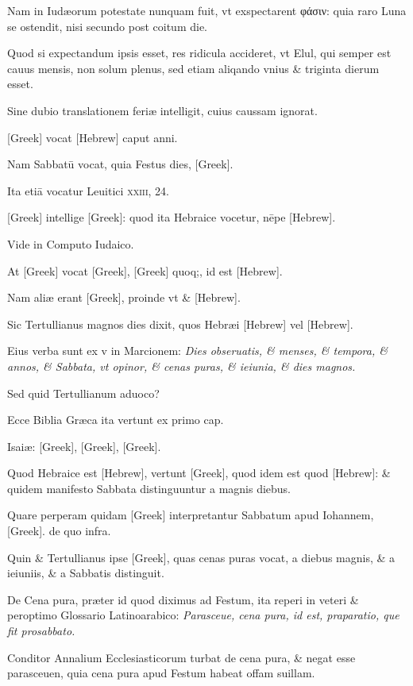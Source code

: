 \begin{parnumbers}
Nam in Iudæorum potestate
nunquam fuit, vt exspectarent \textgreek{φάσιν}: quia raro Luna se ostendit,
nisi secundo post coitum die.

Quod si expectandum ipsis esset,
res ridicula accideret, vt Elul, qui semper est cauus mensis, non solum
plenus, sed etiam aliqando vnius \& triginta dierum esset.

Sine dubio translationem feriæ intelligit, cuius caussam ignorat.

\textgreek{[Greek]} vocat \texthebrew{[Hebrew]} caput anni.

Nam Sabbatū vocat, quia Festus
dies, \textgreek{[Greek]}.

Ita etiā vocatur Leuitici \textsc{xxiii}, 24.

\textgreek{[Greek]} intellige
\textgreek{[Greek]}: quod ita Hebraice vocetur, nēpe \texthebrew{[Hebrew]}.

Vide in Computo Iudaico.

At \textgreek{[Greek]} vocat \textgreek{[Greek],
[Greek]} quoq;, id est \texthebrew{[Hebrew]}.

Nam aliæ erant \textgreek{[Greek]},
proinde vt \& \texthebrew{[Hebrew]}.

Sic Tertullianus magnos dies dixit, quos
Hebræi \texthebrew{[Hebrew]} vel \texthebrew{[Hebrew]}.

Eius verba sunt ex v in Marcionem:
\textit{Dies obseruatis, \& menses, \& tempora, \& annos, \& Sabbata, vt opinor,
\& cenas puras, \& ieiunia, \& dies magnos.}

Sed quid Tertullianum
aduoco?

Ecce Biblia Græca ita vertunt ex primo cap.

Isaiæ:
\textgreek{[Greek], [Greek], [Greek]}.

Quod Hebraice est \texthebrew{[Hebrew]}, vertunt \textgreek{[Greek]}, quod idem
est quod \texthebrew{[Hebrew]}: \& quidem manifesto Sabbata distinguuntur a
magnis diebus. 

Quare perperam quidam \textgreek{[Greek]} interpretantur
Sabbatum apud Iohannem, \textgreek{[Greek]}. de quo infra.

Quin \& Tertullianus ipse \textgreek{[Greek]},
quas cenas puras vocat, a diebus magnis, \& a ieiuniis, \& a
Sabbatis distinguit.

De Cena pura, præter id quod diximus ad
Festum, ita reperi in veteri \& peroptimo Glossario Latinoarabico:
\textit{Parasceue, cena pura, id est, praparatio, que fit prosabbato.}

Conditor Annalium Ecclesiasticorum turbat de cena
pura, \& negat esse parasceuen, quia cena pura apud Festum
habeat offam suillam.


\end{parnumbers}
